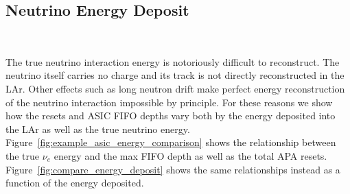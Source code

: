 \subsection{Neutrino Energy Deposit}~\label{sec:neutrino_energy_analysis}

The true neutrino interaction energy is notoriously difficult to reconstruct.
The neutrino itself carries no charge and its track is not directly reconstructed in the LAr.
Other effects such as long neutron drift make perfect energy reconstruction of the neutrino interaction impossible by principle.
For these reasons we show how the resets and ASIC FIFO depths vary both by the energy deposited into the LAr as well as the true neutrino energy.
Figure~\ref{fig:example_asic_energy_comparison} shows the relationship between the true $\nu_{e}$ energy and the max FIFO depth as well as the total APA resets.
Figure~\ref{fig:compare_energy_deposit} shows the same relationships instead as a function of the energy deposited.

